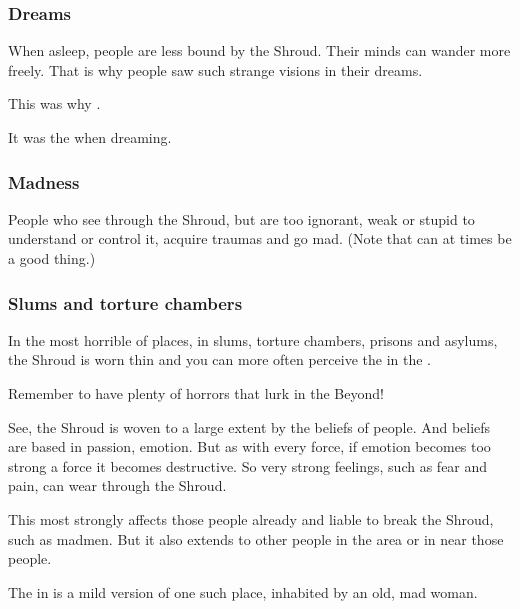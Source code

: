 \subsubsection{Dreams}
When asleep, people are less bound by the Shroud. 
Their minds can wander more freely.
That is why people saw such strange visions in their dreams. 

This was why \LocarPsyrex {}. 

It was  the  when {dreaming}.






\subsubsection{Madness}
People who see through the Shroud, but are too ignorant, weak or stupid to understand or control it, acquire traumas and go mad. (Note that  can at times be a good thing.)







\subsubsection{Slums and torture chambers}
In the most horrible of places, in slums, torture chambers, prisons and asylums, the Shroud is worn thin and you can more often perceive the  in the . 

Remember to have plenty of horrors that lurk in the Beyond! 

See, the Shroud is woven to a large extent by the beliefs of people. And beliefs are based in passion, emotion. But as with every force, if emotion becomes too strong a force it becomes destructive. So very strong feelings, such as fear and pain, can wear through the Shroud. 

This  most strongly affects those people already  and liable to break the Shroud, such as madmen. But it also extends to other people in the area or in near those people. 

The  in \Malcur is a mild version of one such place, inhabited by an old, mad woman.  









